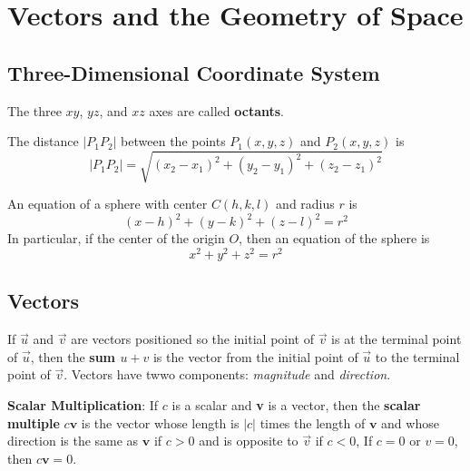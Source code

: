 \setcounter{chapter}{12}
\chapter{Vectors and the Geometry of Space}

\section{Three-Dimensional Coordinate System}
The three $xy$, $yz$, and $xz$ axes are called \textbf{octants}. 

The distance $|P_1P_2|$ between the points $P_1(x,y,z)$ and $P_2(x,y,z)$ is 
$$|P_1P_2| = \sqrt{(x_2 - x_1)^2 + (y_2 - y_1)^2  + (z_2 - z_1)^2}$$

An equation of a sphere with center $C(h, k, l)$ and radius $r$ is 
$$(x - h)^2 + (y - k)^2 + (z - l)^2 = r^2$$ In particular, if the center of the origin $O$, then an equation of the sphere is
$$x^2 + y^2 + z^2 = r^2$$

\section{Vectors}
If $\vec{u}$ and $\vec{v}$ are vectors positioned so the initial point of $\vec{v}$ is at the terminal point of $\vec{u}$, then the \textbf{sum $u + v$} is the vector from the initial point of $\vec{u}$ to the terminal point of $\vec{v}$.
Vectors have twwo components: \textit{magnitude} and \textit{direction}.

\textbf{Scalar Multiplication}: If $c$ is a scalar and \textbf{v} is a vector, then the \textbf{scalar multiple} $c\textbf{v}$ is the vector whose length is $|c|$ times the length of $\textbf{v}$ and whose direction is the same as $\textbf{v}$ if $c > 0$
and is opposite to $\vec{v}$ if $c < 0$, If $c = 0$ or $v = 0$, then $c\textbf{v} = 0$.

